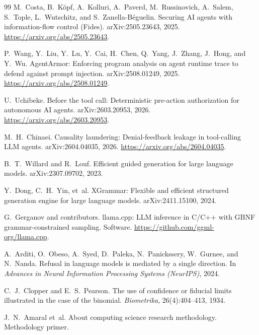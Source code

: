 \begin{thebibliography}{99}
M.~Costa, B.~K\"opf, A.~Kolluri, A.~Paverd, M.~Russinovich, A.~Salem, S.~Tople, L.~Wutschitz, and S.~Zanella-B\'eguelin.
\newblock Securing AI agents with information-flow control (Fides).
\newblock arXiv:2505.23643, 2025. \url{https://arxiv.org/abs/2505.23643}.

P.~Wang, Y.~Liu, Y.~Lu, Y.~Cai, H.~Chen, Q.~Yang, J.~Zhang, J.~Hong, and Y.~Wu.
\newblock AgentArmor: Enforcing program analysis on agent runtime trace to defend against prompt injection.
\newblock arXiv:2508.01249, 2025. \url{https://arxiv.org/abs/2508.01249}.

U.~Uchibeke.
\newblock Before the tool call: Deterministic pre-action authorization for autonomous AI agents.
\newblock arXiv:2603.20953, 2026. \url{https://arxiv.org/abs/2603.20953}.

M.~H.~Chinaei.
\newblock Causality laundering: Denial-feedback leakage in tool-calling LLM agents.
\newblock arXiv:2604.04035, 2026. \url{https://arxiv.org/abs/2604.04035}.

B.~T.~Willard and R.~Louf.
\newblock Efficient guided generation for large language models.
\newblock arXiv:2307.09702, 2023.

Y.~Dong, C.~H.~Yin, et~al.
\newblock XGrammar: Flexible and efficient structured generation engine for large language models.
\newblock arXiv:2411.15100, 2024.

G.~Gerganov and contributors.
\newblock llama.cpp: LLM inference in C/C++ with GBNF grammar-constrained sampling.
\newblock Software. \url{https://github.com/ggml-org/llama.cpp}.

A.~Arditi, O.~Obeso, A.~Syed, D.~Paleka, N.~Panickssery, W.~Gurnee, and N.~Nanda.
\newblock Refusal in language models is mediated by a single direction.
\newblock In \emph{Advances in Neural Information Processing Systems (NeurIPS)}, 2024.

C.~J.~Clopper and E.~S.~Pearson.
\newblock The use of confidence or fiducial limits illustrated in the case of the binomial.
\newblock \emph{Biometrika}, 26(4):404--413, 1934.

J.~N.~Amaral et~al.
\newblock About computing science research methodology.
\newblock Methodology primer.

\end{thebibliography}

